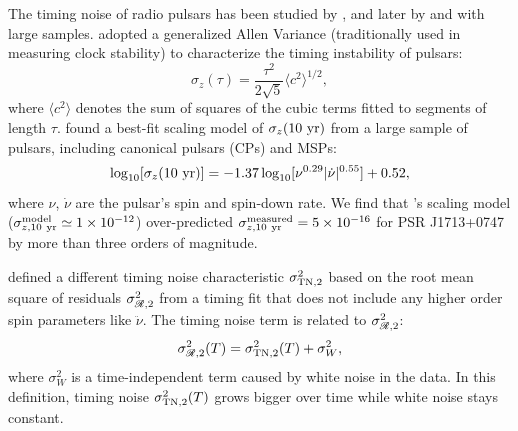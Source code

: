 The timing noise of radio pulsars has been studied by
\citet{ch80,cd85,antt94,dmhd95, mtem97}, and later by \citet{hlk10} and
\citet{sc10} with large samples. 
\citet{mtem97} adopted a generalized Allen Variance (traditionally used in
measuring clock stability) to characterize the timing instability of pulsars:
\begin{equation}
\label{eq:sigmaz}
\sigma_z(\tau) = \frac{\tau^2}{2\sqrt{5}}\langle c^2 \rangle^{1/2},
\end{equation}
where $\langle c^2\rangle$ denotes the sum of squares of the cubic
terms fitted to segments of length $\tau$. 
\citet{hlk10} found a best-fit scaling model of $\sigma_z({\rm 10~yr})$ 
from a large sample of pulsars, including canonical pulsars (CPs) and MSPs:
\begin{equation}
\label{eq:hlk10}
\log_{10}[\sigma_z({\rm 10~yr})] =
-1.37\log_{10}[\nu^{0.29}|\dot{\nu}|^{0.55}]+0.52,
\end{equation} 
where $\nu$, $\dot{\nu}$ are the pulsar's spin and spin-down rate.
We find that \citet{hlk10}'s scaling model ($\sigma^{\rm model}_{z, \rm
10~yr}\simeq1\times10^{-12}$) over-predicted $\sigma^{\rm measured}_{z, \rm
10~yr}=5\times10^{-16}$ for PSR J1713+0747 by more than three orders of magnitude. 

\citet{ch80} defined a different timing noise characteristic $\sigma^2_{\rm
TN,2}$ based on the root mean square of residuals $\sigma^2_{\mathscr{R},2}$ from a
timing fit that does not include any higher order spin parameters like
$\ddot{\nu}$. 
The timing noise term is related to $\sigma^2_{\mathscr{R},2}$:
\begin{equation}
\sigma^2_{\msR,2}(T) = \sigma^2_{\rm TN,2}(T) + \sigma^2_W, 
\end{equation}
where $\sigma^2_W$ is a time-independent term caused by white 
noise in the data.
In this definition, timing noise $\sigma^2_{\rm TN,2}(T)$ grows bigger over
time while white noise stays constant.  

